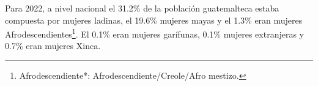 Para 2022, a nivel nacional el 31.2\% de la población guatemalteca estaba compuesta por mujeres ladinas, el 19.6\% mujeres mayas y el 1.3\% eran mujeres Afrodescendientes\footnote{Afrodescendiente*: Afrodescendiente/Creole/Afro mestizo.}. El 0.1\% eran mujeres garífunas, 0.1\% mujeres extranjeras y 0.7\% eran mujeres Xinca.